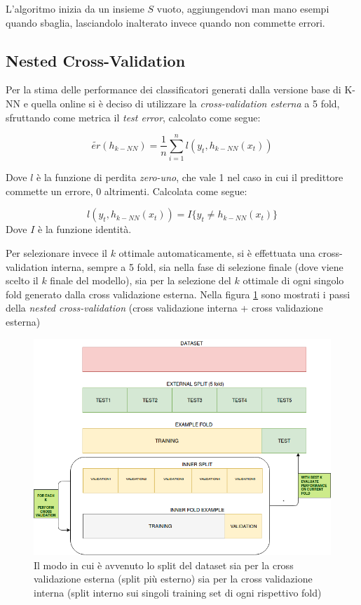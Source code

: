 \documentclass[fleqn,10pt]{SelfArx} %
\begin{document}
L'algoritmo inizia da un insieme $S$ vuoto, aggiungendovi man mano esempi quando sbaglia, lasciandolo inalterato invece quando non commette errori.

\subsection{Nested Cross-Validation}
Per la stima delle performance dei classificatori generati dalla versione base di K-NN e quella online si è deciso di utilizzare la \emph{cross-validation esterna} a 5 fold, sfruttando come metrica il \emph{test error}\cite{cesa:risk}, calcolato come segue:

\[\widetilde{er}(h_{k-NN})=\frac{1}{n}\sum_{i=1}^{n} l(y_t,h_{k-NN}(x_t))\]

Dove $l$ è la funzione di perdita \emph{zero-uno}, che vale 1 nel caso in cui il predittore commette un errore, 0 altrimenti. Calcolata come segue:

\[
l(y_t,h_{k-NN}(x_t)) = I\{y_t\neq h_{k-NN}(x_t)\}
\]
Dove $I$ è la funzione identità.
\newline

Per selezionare invece il $k$ ottimale automaticamente, si è effettuata una cross-validation interna, sempre a 5 fold, sia nella fase di selezione finale (dove viene scelto il $k$ finale del modello), sia per la selezione del $k$ ottimale di ogni singolo fold generato dalla cross validazione esterna. Nella figura \ref{cross} sono mostrati i passi della \emph{nested cross-validation} (cross validazione interna + cross validazione esterna)
\begin{figure}
\includegraphics[scale=0.33]{cross.png}
\caption{\footnotesize{Il modo in cui è avvenuto lo split del dataset sia per la cross validazione esterna (split più esterno) sia per la cross validazione interna (split interno sui singoli training set di ogni rispettivo fold)}}
\label{cross}
\end{figure}
\end{document}
